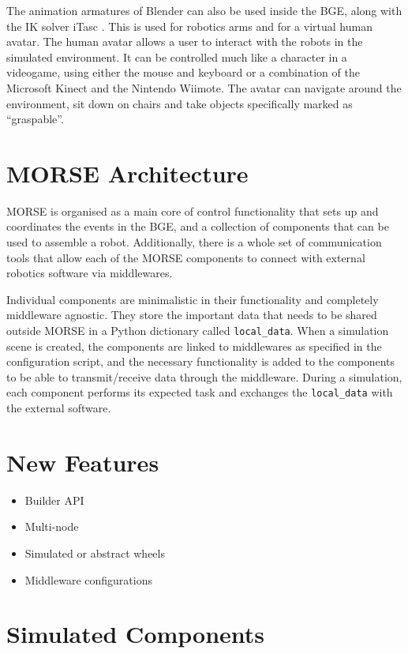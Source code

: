 \documentclass{llncs}
\begin{document}
The animation armatures of Blender can also be used inside the BGE, along with the IK solver iTasc \cite{iTaSC}. This is used for robotics arms and for a virtual human avatar.
The human avatar allows a user to interact with the robots in the simulated environment. It can be controlled much like a character in a videogame, using either the mouse and keyboard or a combination of the Microsoft Kinect and the Nintendo Wiimote. The avatar can navigate around the environment, sit down on chairs and take objects specifically marked as ``graspable''.


\section{MORSE Architecture}
\label{section:architecture}

MORSE is organised as a main core of control functionality that sets up and coordinates the events in the BGE, and a collection of components that can be used to assemble a robot. Additionally, there is a whole set of communication tools that allow each of the MORSE components to connect with external robotics software via middlewares.

Individual components are minimalistic in their functionality and  completely middleware agnostic. They store the important data that needs to be shared outside MORSE in a Python dictionary called \texttt{local\_data}.
When a simulation scene is created, the components are linked to middlewares as specified in the configuration script, and the necessary functionality is added to the components to be able to transmit/receive data through the middleware.
During a simulation, each component performs its expected task and exchanges the \texttt{local\_data} with the external software.


\section{New Features}

\begin{itemize}
  \item Builder API
  \item Multi-node
  \item Simulated or abstract wheels
  \item Middleware configurations
\end{itemize}



\section{Simulated Components}
\label{section:components}
\end{document}
